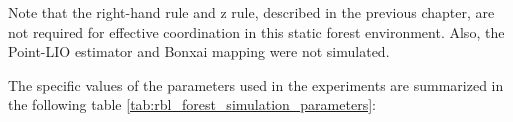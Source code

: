             Note that the right-hand rule and z rule, described in the previous chapter, are not required for effective coordination in this static forest environment.
            Also, the \ac{Point-LIO} estimator and Bonxai mapping were not simulated.

            The specific values of the parameters used in the experiments are summarized in the following table \ref{tab:rbl_forest_simulation_parameters}:



